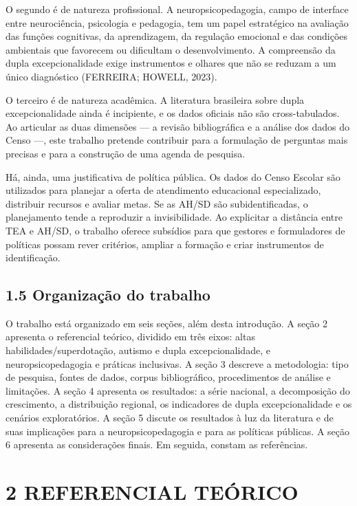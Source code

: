 O segundo é de natureza profissional. A neuropsicopedagogia, campo de
interface entre neurociência, psicologia e pedagogia, tem um papel
estratégico na avaliação das funções cognitivas, da aprendizagem, da
regulação emocional e das condições ambientais que favorecem ou
dificultam o desenvolvimento. A compreensão da dupla excepcionalidade
exige instrumentos e olhares que não se reduzam a um único diagnóstico
(FERREIRA; HOWELL, 2023).

O terceiro é de natureza acadêmica. A literatura brasileira sobre dupla
excepcionalidade ainda é incipiente, e os dados oficiais não são
cross-tabulados. Ao articular as duas dimensões --- a revisão
bibliográfica e a análise dos dados do Censo ---, este trabalho pretende
contribuir para a formulação de perguntas mais precisas e para a
construção de uma agenda de pesquisa.

Há, ainda, uma justificativa de política pública. Os dados do Censo
Escolar são utilizados para planejar a oferta de atendimento educacional
especializado, distribuir recursos e avaliar metas. Se as AH/SD são
subidentificadas, o planejamento tende a reproduzir a invisibilidade. Ao
explicitar a distância entre TEA e AH/SD, o trabalho oferece subsídios
para que gestores e formuladores de políticas possam rever critérios,
ampliar a formação e criar instrumentos de identificação.

\subsection{1.5 Organização do
trabalho}\label{organizauxe7uxe3o-do-trabalho}

O trabalho está organizado em seis seções, além desta introdução. A
seção 2 apresenta o referencial teórico, dividido em três eixos: altas
habilidades/superdotação, autismo e dupla excepcionalidade, e
neuropsicopedagogia e práticas inclusivas. A seção 3 descreve a
metodologia: tipo de pesquisa, fontes de dados, corpus bibliográfico,
procedimentos de análise e limitações. A seção 4 apresenta os
resultados: a série nacional, a decomposição do crescimento, a
distribuição regional, os indicadores de dupla excepcionalidade e os
cenários exploratórios. A seção 5 discute os resultados à luz da
literatura e de suas implicações para a neuropsicopedagogia e para as
políticas públicas. A seção 6 apresenta as considerações finais. Em
seguida, constam as referências.

\section{2 REFERENCIAL TEÓRICO}\label{referencial-teuxf3rico}

